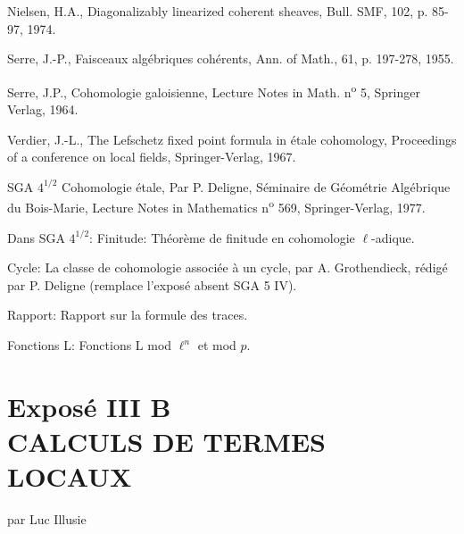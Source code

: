 \documentclass[11pt]{article}
\begin{document}
\begin{enumerate}[label={[\arabic*]},leftmargin=3.5em]
\item Nielsen, H.A., Diagonalizably linearized coherent sheaves, Bull. SMF, 102, p. 85-97, 1974.
\item Serre, J.-P., Faisceaux algébriques cohérents, Ann. of Math., 61, p. 197-278, 1955.
\item Serre, J.P., Cohomologie galoisienne, Lecture Notes in Math. n\textsuperscript{o} 5, Springer Verlag, 1964.
\item Verdier, J.-L., The Lefschetz fixed point formula in étale cohomology, Proceedings of a conference on local fields, Springer-Verlag, 1967.
\end{enumerate}

SGA $4^{1/2}$ Cohomologie étale, Par P. Deligne, Séminaire de Géométrie Algébrique du Bois-Marie, Lecture Notes in Mathematics n\textsuperscript{o} 569, Springer-Verlag, 1977.

Dans SGA $4^{1/2}$: Finitude: Théorème de finitude en cohomologie $\ell$-adique.

Cycle: La classe de cohomologie associée à un cycle, par A. Grothendieck, rédigé par P. Deligne (remplace l'exposé absent SGA 5 IV).

Rapport: Rapport sur la formule des traces.

Fonctions L: Fonctions L mod $\ell^n$ et mod $p$.

\clearpage
\section*{Exposé III B\\CALCULS DE TERMES LOCAUX}
\begin{center}
par Luc Illusie
\end{center}
\end{document}
